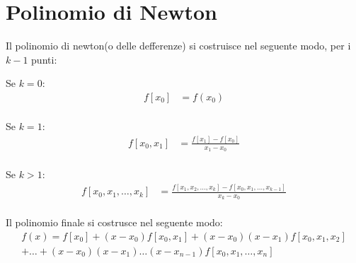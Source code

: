 \chapter{Polinomio di Newton}

Il polinomio di newton(o delle defferenze) si costruisce nel seguente modo, per i $k-1$ punti:

Se $k=0$:
\begin{align}
  f[x_0] &= f(x_0) \\
\end{align}

Se $k=1$:
\begin{align}
  f[x_0,x_1] &= \frac{f[x_1]-f[x_0]}{x_1-x_0} \\
\end{align}

Se $k>1$:
\begin{align}
  f[x_0,x_1,\dots,x_k] &= \frac{f[x_1,x_2,\dots,x_k]-f[x_0,x_1,\dots,x_{k-1}]}{x_k-x_0} \\
\end{align}


Il polinomio finale si costrusce nel seguente modo:
\begin{align}
  f(x) = f[x_0] + (x-x_0)f[x_0,x_1] + (x-x_0)(x-x_1)f[x_0,x_1,x_2] \\ + \dots + (x-x_0)(x-x_1)\dots(x-x_{n-1})f[x_0,x_1,\dots,x_n]
\end{align}
